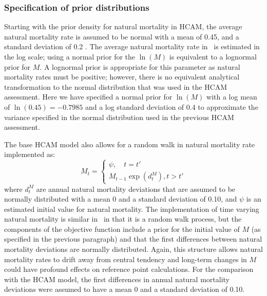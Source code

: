 \subsubsection{Specification of prior distributions}
	Starting with the prior density for natural mortality in HCAM, the average natural mortality rate is assumed to be normal with a mean of 0.45, and a standard deviation of 0.2 \citep[see Table 3 in][]{Clear2010}.  The average natural mortality rate in \iscam\ is estimated in the log scale; using a normal prior for the $\ln(M)$ is equivalent to a lognormal prior for $M$.  A lognormal prior is appropriate for this parameter as natural mortality rates must be positive; however, there is no equivalent analytical transformation to the normal distribution that was used in the HCAM assessment.  Here we have specified a  normal prior for $\ln(M)$ with a log mean of $\ln(0.45)=-0.7985$ and a log standard deviation of 0.4 to approximate the variance specified in the normal distribution used in the previous HCAM assessment.
	
	The base HCAM model also allows for a random walk in natural mortality rate implemented as:
\[
M_t =\begin{cases}
	 \psi, \quad t=t'\\
	 M_{t-1}\exp(d_t^M), t>t'
	 \end{cases}
\]
where $d_t^M$ are annual natural mortality deviations that are assumed to be normally distributed with a mean 0 and a standard deviation of 0.10, and $\psi$ is an estimated initial value for natural mortality.  The implementation of time varying natural mortality is similar in \iscam\ in that it is a random walk process, but the components of the objective function include a prior for the initial value of $M$ (as specified in the previous paragraph) and that the first differences between natural mortality deviations are normally distributed. Again, this structure allows natural mortality rates to drift away from central tendency and long-term changes in $M$ could have profound effects on reference point calculations.  For the comparison with the HCAM model, the first differences in annual natural mortality deviations were assumed to have a mean 0 and a standard deviation of 0.10.


